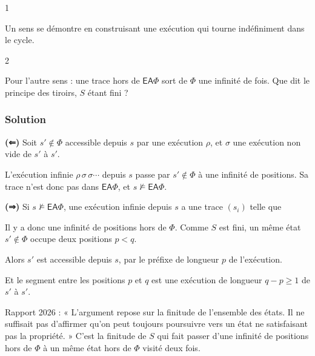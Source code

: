 \documentclass[11pt,a4paper]{article}
\newcommand{\equationajustee}[1]{%
  \sbox{\boiteequation}{$\displaystyle #1$}%
  \ifdim\wd\boiteequation>\linewidth
    \[\resizebox{\linewidth}{!}{\usebox{\boiteequation}}\]%
  \else
    \[#1\]%
  \fi}
\begin{document}
\begin{indication}{1}

Un sens se démontre en construisant une exécution qui tourne indéfiniment dans le cycle.

\end{indication}

\begin{indication}{2}

Pour l'autre sens : une trace hors de \(\mathsf{EA}\Phi\) sort de \(\Phi\) une infinité de fois. Que dit le principe des tiroirs, \(S\) étant fini ?

\end{indication}

\hypertarget{solution-7}{%
\subsubsection{Solution}\label{solution-7}}

\textbf{(⇐)} Soit \(s'\notin\Phi\) accessible depuis \(s\) par une exécution \(\rho\), et \(\sigma\) une exécution non vide de \(s'\) à \(s'\).

L'exécution infinie \(\rho\,\sigma\,\sigma\cdots\) depuis \(s\) passe par \(s'\notin\Phi\) à une infinité de positions. Sa trace n'est donc pas dans \(\mathsf{EA}\Phi\), et \(s\not\models\mathsf{EA}\Phi\).

\textbf{(⇒)} Si \(s\not\models\mathsf{EA}\Phi\), une exécution infinie depuis \(s\) a une trace \((s_i)\) telle que

\equationajustee{\forall i\in\mathbb N,\ \exists j\ge i,\ s_j\notin\Phi.}

Il y a donc une infinité de positions hors de \(\Phi\). Comme \(S\) est fini, un même état \(s'\notin\Phi\) occupe deux positions \(p<q\).

Alors \(s'\) est accessible depuis \(s\), par le préfixe de longueur \(p\) de l'exécution.

Et le segment entre les positions \(p\) et \(q\) est une exécution de longueur \(q-p\ge1\) de \(s'\) à \(s'\).

\begin{jury}

Rapport 2026 : « L'argument repose sur la finitude de l'ensemble des états. Il ne suffisait pas d'affirmer qu'on peut toujours poursuivre vers un état ne satisfaisant pas la propriété. » C'est la finitude de \(S\) qui fait passer d'une infinité de positions hors de \(\Phi\) à un même état hors de \(\Phi\) visité deux fois.

\end{jury}
\end{document}
